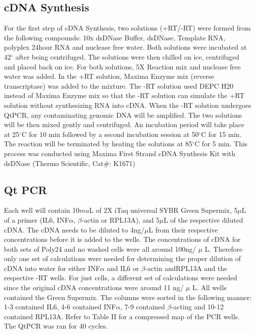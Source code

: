 \documentclass[journal, a4paper]{IEEEtran}
\begin{document}
    \subsection{cDNA Synthesis}
      For the first step of cDNA Synthesis, two solutions (+RT/-RT) were formed from the following compounds:
      10x dsDNase Buffer, dsDNase, Template RNA, polyplex 24hour RNA and nuclease free water.
      Both solutions were incubated at 42$^{\circ}$ after being centrifuged. The solutions were then chilled on ice, centrifuged and placed back on ice.
      For both solutions, 5X Reaction mix and nuclease free water was added. In the +RT solution, Maxima Enzyme mix (reverse transcriptase) was added to the mixture.
      The -RT solution used DEPC H20 instead of Maxima Enzyme mix so that the -RT solution can simulate the +RT solution without synthesizing RNA into cDNA.
      When the -RT solution undergoes QtPCR, any contaminating genomic DNA will be amplified.
      The two solutions will be then mixed gently and centrifuged. An incubation period will take place at 25$^{\circ}$C for 10 min
      followed by a second incubation session at 50$^{\circ}$C for 15 min.
      The reaction will be terminated by heating the solutions at 85$^{\circ}$C for 5 min.
      This process was conducted using Maxima First Strand cDNA Synthesis Kit with dsDNase (Thermo Scientific, Cat#: K1671)

    \subsection{Qt PCR}
      Each well will contain 10$mu$L of 2X iTaq universal SYBR Green Supermix,
      5$\mu$L of a primer (IL6, INF$\alpha$, $\beta$-actin or RPL13A),
      and 5$\mu$L of the respective diluted cDNA.
      The cDNA needs to be diluted to 4ng/$\mu$L from their respective concentrations before it is added to the wells.
      The concentrations of cDNA for both sets of Poly24 and no washed cells were all around 100ng/ $\mu$ L.
      Therefore only one set of calculations were needed for determining the proper dilution of cDNA into water
      for either INF$\alpha$ and IL6 or $\beta$-actin andRPL13A and the respective -RT wells. For just cells,
      a different set of calculations were needed since the original cDNA concentrations were around 11 ng/ $\mu$ L.
      All wells contained the Green Supermix. The columns were sorted in the following manner:
      1-3 contained IL6, 4-6 contained INF$\alpha$, 7-9 contained $\beta$-acting and 10-12 contained RPL13A.
      Refer to Table II for a compressed map of the PCR wells. The QtPCR was ran for 40 cycles.
\end{document}
